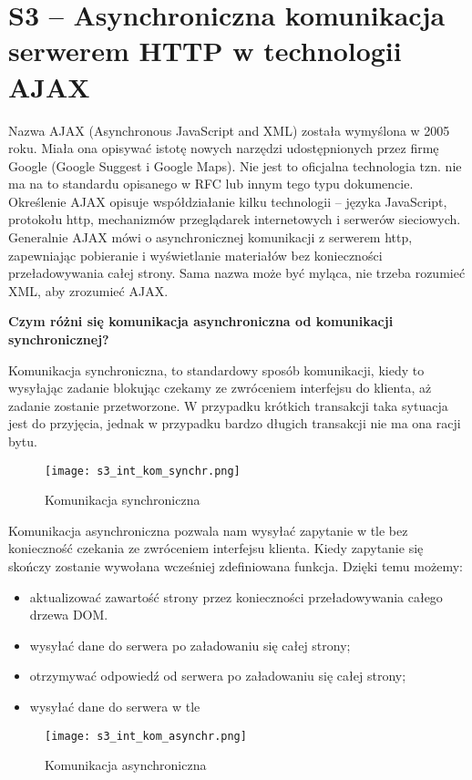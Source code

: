 \section{S3 -- Asynchroniczna komunikacja serwerem HTTP w technologii AJAX}

Nazwa AJAX (Asynchronous JavaScript and XML) została wymyślona w 2005 roku. Miała ona opisywać istotę nowych narzędzi udostępnionych przez firmę Google (Google Suggest i Google Maps). Nie jest to oficjalna technologia tzn. nie ma na to standardu opisanego w RFC lub innym tego typu dokumencie. Określenie AJAX opisuje współdziałanie kilku technologii – języka JavaScript, protokołu http, mechanizmów przeglądarek internetowych i serwerów sieciowych. Generalnie AJAX mówi o asynchronicznej komunikacji z serwerem http, zapewniając pobieranie i wyświetlanie materiałów bez konieczności przeładowywania całej strony. Sama nazwa może być myląca, nie trzeba rozumieć XML, aby zrozumieć AJAX.

\textbf{Czym różni się komunikacja asynchroniczna od komunikacji synchronicznej?}

Komunikacja synchroniczna, to standardowy sposób komunikacji, kiedy to wysyłając zadanie blokując czekamy ze zwróceniem interfejsu do klienta, aż zadanie zostanie przetworzone. W przypadku krótkich transakcji taka sytuacja jest do przyjęcia, jednak w przypadku bardzo długich transakcji nie ma ona racji bytu. 
\begin{figure}[H]
\centering
\caption{Komunikacja synchroniczna}
\texttt{[image: s3\_int\_kom\_synchr.png]}
\end{figure}

Komunikacja asynchroniczna pozwala nam wysyłać zapytanie w tle bez konieczność czekania ze zwróceniem interfejsu klienta. Kiedy zapytanie się skończy zostanie wywołana wcześniej zdefiniowana funkcja. Dzięki temu możemy:
\begin{itemize}
\item aktualizować zawartość strony przez konieczności przeładowywania całego drzewa DOM. 
\item wysyłać dane do serwera po załadowaniu się całej strony;
\item otrzymywać odpowiedź od serwera po załadowaniu się całej strony;
\item wysyłać dane do serwera w tle
\end{itemize}

\begin{figure}[H]
\centering
\caption{Komunikacja asynchroniczna}
\texttt{[image: s3\_int\_kom\_asynchr.png]}
\end{figure}


